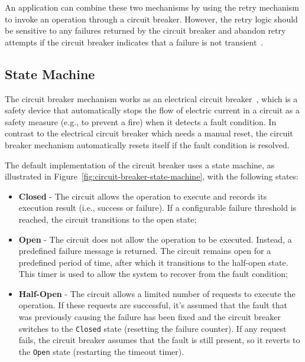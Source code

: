 An application can combine these two mechanisms by using the retry mechanism to invoke an operation through a circuit breaker.
However,
the retry logic should be sensitive to any failures returned by the circuit breaker
and abandon retry attempts
if the circuit breaker indicates that a failure is not transient~\cite{microsoft-cbreaker-pattern}.

\subsection{State Machine}\label{subsec:cbreaker-state-machine}

The circuit breaker mechanism works as an electrical circuit breaker~\cite{electrical-circuit-breaker},
which is a safety device that automatically stops the flow of electric current in a circuit as a safety measure
(e.g., to prevent a fire) when it detects a fault condition.
In contrast to the electrical circuit breaker which needs a manual reset,
the circuit breaker mechanism automatically resets itself if the fault condition is resolved.

The default implementation of the circuit breaker uses a state machine,
as illustrated in Figure~\ref{fig:circuit-breaker-state-machine}, with the following states:

\begin{itemize}
    \item \textbf{Closed} - The circuit allows the operation to execute and records its execution result
    (i.e., success or failure).
    If a configurable failure threshold is reached, the circuit transitions to the open state;
    \item \textbf{Open} - The circuit does not allow the operation to be executed.
    Instead, a predefined failure message is returned.
    The circuit remains open for a predefined period of time, after which it transitions to the half-open state.
    This timer is used to allow the system to recover from the fault condition;
    \item \textbf{Half-Open} - The circuit allows a limited number of requests to execute the operation.
    If these requests are successful,
    it's assumed that the fault
    that was previously causing the failure has been fixed and the circuit breaker switches to the \texttt{Closed} state
    (resetting the failure counter).
    If any request fails,
    the circuit breaker assumes that the fault is still present,
    so it reverts to the \texttt{Open} state (restarting the timeout timer).
\end{itemize}

